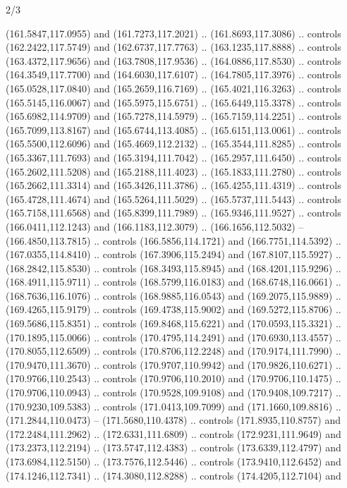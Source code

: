 \begin{flagdescription}{2/3}
\begin{scope}[shift={(0.5\flaglength,0.5)},scale=\flagwidth/320]
\begin{scope}[y=0.8pt, x=0.8pt, yscale=-1,shift={(-118.3,-146)}]
  (161.5847,117.0955) and (161.7273,117.2021) .. (161.8693,117.3086) .. controls
  (162.2422,117.5749) and (162.6737,117.7763) .. (163.1235,117.8888) .. controls
  (163.4372,117.9656) and (163.7808,117.9536) .. (164.0886,117.8530) .. controls
  (164.3549,117.7700) and (164.6030,117.6107) .. (164.7805,117.3976) .. controls
  (165.0528,117.0840) and (165.2659,116.7169) .. (165.4021,116.3263) .. controls
  (165.5145,116.0067) and (165.5975,115.6751) .. (165.6449,115.3378) .. controls
  (165.6982,114.9709) and (165.7278,114.5979) .. (165.7159,114.2251) .. controls
  (165.7099,113.8167) and (165.6744,113.4085) .. (165.6151,113.0061) .. controls
  (165.5500,112.6096) and (165.4669,112.2132) .. (165.3544,111.8285) .. controls
  (165.3367,111.7693) and (165.3194,111.7042) .. (165.2957,111.6450) .. controls
  (165.2602,111.5208) and (165.2188,111.4023) .. (165.1833,111.2780) .. controls
  (165.2662,111.3314) and (165.3426,111.3786) .. (165.4255,111.4319) .. controls
  (165.4728,111.4674) and (165.5264,111.5029) .. (165.5737,111.5443) .. controls
  (165.7158,111.6568) and (165.8399,111.7989) .. (165.9346,111.9527) .. controls
  (166.0411,112.1243) and (166.1183,112.3079) .. (166.1656,112.5032) --
  (166.4850,113.7815) .. controls (166.5856,114.1721) and (166.7751,114.5392) ..
  (167.0355,114.8410) .. controls (167.3906,115.2494) and (167.8107,115.5927) ..
  (168.2842,115.8530) .. controls (168.3493,115.8945) and (168.4201,115.9296) ..
  (168.4911,115.9711) .. controls (168.5799,116.0183) and (168.6748,116.0661) ..
  (168.7636,116.1076) .. controls (168.9885,116.0543) and (169.2075,115.9889) ..
  (169.4265,115.9179) .. controls (169.4738,115.9002) and (169.5272,115.8706) ..
  (169.5686,115.8351) .. controls (169.8468,115.6221) and (170.0593,115.3321) ..
  (170.1895,115.0066) .. controls (170.4795,114.2491) and (170.6930,113.4557) ..
  (170.8055,112.6509) .. controls (170.8706,112.2248) and (170.9174,111.7990) ..
  (170.9470,111.3670) .. controls (170.9707,110.9942) and (170.9826,110.6271) ..
  (170.9766,110.2543) .. controls (170.9706,110.2010) and (170.9706,110.1475) ..
  (170.9706,110.0943) .. controls (170.9528,109.9108) and (170.9408,109.7217) ..
  (170.9230,109.5383) .. controls (171.0413,109.7099) and (171.1660,109.8816) ..
  (171.2844,110.0473) -- (171.5680,110.4378) .. controls (171.8935,110.8757) and
  (172.2484,111.2962) .. (172.6331,111.6809) .. controls (172.9231,111.9649) and
  (173.2373,112.2194) .. (173.5747,112.4383) .. controls (173.6339,112.4797) and
  (173.6984,112.5150) .. (173.7576,112.5446) .. controls (173.9410,112.6452) and
  (174.1246,112.7341) .. (174.3080,112.8288) .. controls (174.4205,112.7104) and

\end{scope}
\end{scope}
\end{flagdescription}

